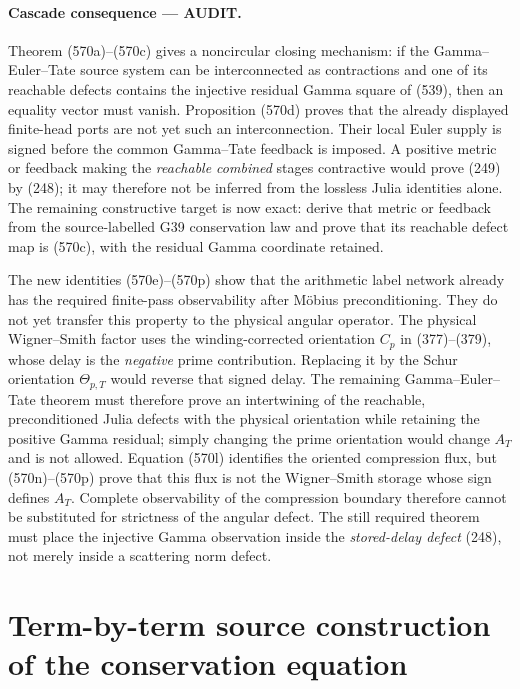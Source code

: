 \documentclass[11pt]{article}
\newcommand{\AUDIT}{\textcolor{orange!75!black}{\textbf{AUDIT}}}
\begin{document}
\paragraph{Cascade consequence --- \AUDIT.}
Theorem (570a)--(570c) gives a noncircular closing mechanism: if the
Gamma--Euler--Tate source system can be interconnected as contractions and
one of its reachable defects contains the injective residual Gamma square
of (539), then an equality vector must vanish.  Proposition (570d) proves
that the already displayed finite-head ports are not yet such an
interconnection.  Their local Euler supply is signed before the common
Gamma--Tate feedback is imposed.  A positive metric or feedback making the
\emph{reachable combined} stages contractive would prove (249) by (248);
it may therefore not be inferred from the lossless Julia identities alone.
The remaining constructive target is now exact: derive that metric or
feedback from the source-labelled G39 conservation law and prove that its
reachable defect map is (570c), with the residual Gamma coordinate retained.

The new identities (570e)--(570p) show that the arithmetic label network
already has the required finite-pass observability after M\"obius
preconditioning.  They do not yet transfer this property to the physical
angular operator.  The physical Wigner--Smith factor uses the
winding-corrected orientation \(C_p\) in (377)--(379), whose delay is the
\emph{negative} prime contribution.  Replacing it by the Schur orientation
\(\Theta_{p,T}\) would reverse that signed delay.  The remaining
Gamma--Euler--Tate theorem must therefore prove an intertwining of the
reachable, preconditioned Julia defects with the physical orientation while
retaining the positive Gamma residual; simply changing the prime orientation
would change \(A_T\) and is not allowed.  Equation (570l) identifies the
oriented compression flux, but (570n)--(570p) prove that this flux is not
the Wigner--Smith storage whose sign defines \(A_T\).  Complete
observability of the compression boundary therefore cannot be substituted
for strictness of the angular defect.  The still required theorem must place
the injective Gamma observation inside the \emph{stored-delay defect}
(248), not merely inside a scattering norm defect.

\section{Term-by-term source construction of the conservation equation}
\end{document}
